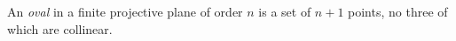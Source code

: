 An \textit{oval} in a finite projective plane of order $n$ is a set of $n+1$ points, no three of which are collinear.
